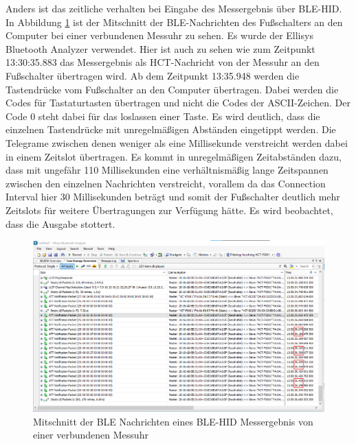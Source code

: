 Anders ist das zeitliche verhalten bei Eingabe des Messergebnis über BLE-HID. In Abbildung \ref{fig:MitschnittEinerMessuhr} ist der Mitschnitt der BLE-Nachrichten des Fußschalters an den Computer bei einer verbundenen Messuhr zu sehen. Es wurde der Ellisys Bluetooth Analyzer verwendet. Hier ist auch zu sehen wie zum Zeitpunkt 13:30:35.883 das Messergebnis als HCT-Nachricht von der Messuhr an den Fußschalter übertragen wird. Ab dem Zeitpunkt 13:35.948 werden die Tastendrücke vom Fußschalter an den Computer übertragen. Dabei werden die Codes für Tastaturtasten übertragen und nicht die Codes der ASCII-Zeichen. Der Code 0 steht dabei für das loslassen einer Taste. Es wird deutlich, dass die einzelnen Tastendrücke mit unregelmäßigen Abständen eingetippt werden. Die Telegrame zwischen denen weniger als eine Millisekunde verstreicht werden dabei in einem Zeitslot übertragen. Es kommt in unregelmäßigen Zeitabständen dazu, dass mit ungefähr 110 Millisekunden eine verhältnismäßig lange Zeitspannen zwischen den einzelnen Nachrichten verstreicht, vorallem da das Connection Interval hier 30 Millisekunden beträgt und somit der Fußschalter deutlich mehr Zeitslots für weitere Übertragungen zur Verfügung hätte. Es wird beobachtet, dass die Ausgabe stottert.
\begin{figure}[H] 
	\centering
	\includegraphics[width=\textwidth]{figures/BLEHID1device.png}
	\caption{Mitschnitt der BLE Nachrichten eines BLE-HID Messergebnis von einer verbundenen Messuhr}
	\label{fig:MitschnittEinerMessuhr}
\end{figure}

